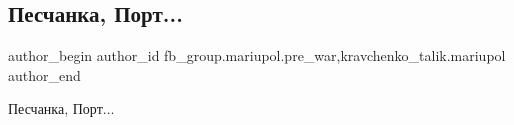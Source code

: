  
 
 
 
 

\subsection{Песчанка, Порт...}
\label{sec:16_02_2023.fb.fb_group.mariupol.pre_war.3.peschanka__port_}
 
\ifcmt
 author_begin
   author_id fb_group.mariupol.pre_war,kravchenko_talik.mariupol
 author_end
\fi

Песчанка, Порт...
